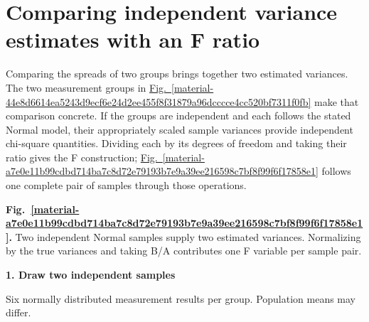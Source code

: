 \documentclass[11pt,a4paper]{article}
\begin{document}

\medskip

\clearpage
\section{Comparing independent variance estimates with an F ratio}
Comparing the spreads of two groups brings together two estimated variances. The two measurement groups in \hyperref[material-44e8d6614ea5243d9ecf6e24d2ee455f8f31879a96dcccce4cc520bf7311f0fb]{Fig.~\ref*{material-44e8d6614ea5243d9ecf6e24d2ee455f8f31879a96dcccce4cc520bf7311f0fb}} make that comparison concrete. If the groups are independent and each follows the stated Normal model, their appropriately scaled sample variances provide independent chi-square quantities. Dividing each by its degrees of freedom and taking their ratio gives the F construction; \hyperref[material-a7e0e11b99cdbd714ba7c8d72e79193b7e9a39ee216598c7bf8f99f6f17858e1]{Fig.~\ref*{material-a7e0e11b99cdbd714ba7c8d72e79193b7e9a39ee216598c7bf8f99f6f17858e1}} follows one complete pair of samples through those operations.


\par\medskip
\Needspace{10cm}
\label{material-a7e0e11b99cdbd714ba7c8d72e79193b7e9a39ee216598c7bf8f99f6f17858e1}
\noindent\textbf{Fig.~\ref*{material-a7e0e11b99cdbd714ba7c8d72e79193b7e9a39ee216598c7bf8f99f6f17858e1}.} Two independent Normal samples supply two estimated variances. Normalizing by the true variances and taking B/A contributes one F variable per sample pair.\par\nopagebreak
\par\medskip\noindent\textcolor{pcd1}{\textbf{1. Draw two independent samples}}\par
Six normally distributed measurement results per group. Population means may differ.
\end{document}
